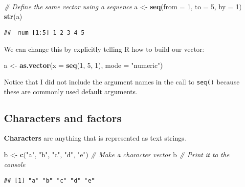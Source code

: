 \documentclass[
]{book}
\newenvironment{Shaded}{\begin{snugshade}}{\end{snugshade}}
\newcommand{\CommentTok}[1]{\textcolor[rgb]{0.56,0.35,0.01}{\textit{#1}}}
\newcommand{\DataTypeTok}[1]{\textcolor[rgb]{0.13,0.29,0.53}{#1}}
\newcommand{\DecValTok}[1]{\textcolor[rgb]{0.00,0.00,0.81}{#1}}
\newcommand{\KeywordTok}[1]{\textcolor[rgb]{0.13,0.29,0.53}{\textbf{#1}}}
\newcommand{\NormalTok}[1]{#1}
\newcommand{\StringTok}[1]{\textcolor[rgb]{0.31,0.60,0.02}{#1}}
\begin{document}
\begin{Shaded}
\begin{Highlighting}[]
\CommentTok{# Define the same vector using a sequence}
\NormalTok{a <-}\StringTok{ }\KeywordTok{seq}\NormalTok{(}\DataTypeTok{from =} \DecValTok{1}\NormalTok{, }\DataTypeTok{to =} \DecValTok{5}\NormalTok{, }\DataTypeTok{by =} \DecValTok{1}\NormalTok{)}
\KeywordTok{str}\NormalTok{(a)}
\end{Highlighting}
\end{Shaded}

\begin{verbatim}
##  num [1:5] 1 2 3 4 5
\end{verbatim}

We can change this by explicitly telling R how to build our vector:

\begin{Shaded}
\begin{Highlighting}[]
\NormalTok{a <-}\StringTok{ }\KeywordTok{as.vector}\NormalTok{(}\DataTypeTok{x =} \KeywordTok{seq}\NormalTok{(}\DecValTok{1}\NormalTok{, }\DecValTok{5}\NormalTok{, }\DecValTok{1}\NormalTok{), }\DataTypeTok{mode =} \StringTok{"numeric"}\NormalTok{)}
\end{Highlighting}
\end{Shaded}

Notice that I did not include the argument names in the call to \texttt{seq()} because these are commonly used default arguments.

\hypertarget{strings}{%
\subsection*{Characters and factors}\label{strings}}

\textbf{Characters} are anything that is represented as text strings.

\begin{Shaded}
\begin{Highlighting}[]
\NormalTok{b <-}\StringTok{ }\KeywordTok{c}\NormalTok{(}\StringTok{"a"}\NormalTok{, }\StringTok{"b"}\NormalTok{, }\StringTok{"c"}\NormalTok{, }\StringTok{"d"}\NormalTok{, }\StringTok{"e"}\NormalTok{) }\CommentTok{# Make a character vector}
\NormalTok{b }\CommentTok{# Print it to the console}
\end{Highlighting}
\end{Shaded}

\begin{verbatim}
## [1] "a" "b" "c" "d" "e"
\end{verbatim}
\end{document}
